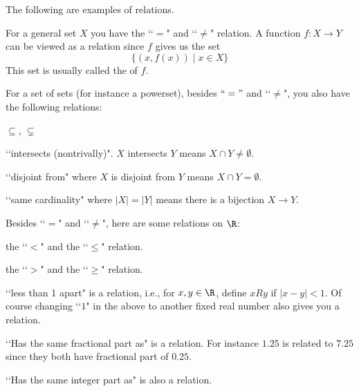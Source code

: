 The following are examples of relations.

\begin{eg}
  For a general set $X$ you have the \lq\lq $=$" and \lq\lq $\neq$" relation.
  A function $f:X \rightarrow Y$ can be viewed as a relation since $f$
  gives us the set
  \[
  \{ (x, f(x)) \mid x \in X \}
  \]
  This set is usually called the  of $f$.
\end{eg}

\begin{eg}
  For a set of sets (for instance a powerset), besides $\lq\lq ="$
  and \lq\lq$\neq$", you also have the following relations: 
  \begin{myenum}
    \item  $\subseteq$, $\subsetneq$
    \item \lq\lq intersects (nontrivally)".
      $X$ intersects $Y$ means $X \cap Y \neq \emptyset$.
    \item \lq\lq disjoint from" where
    $X$ is disjoint from $Y$ means $X \cap Y = \emptyset$.
    \item \lq\lq same cardinality" where
    $|X| = |Y|$ means there is a bijection $X \rightarrow Y$.
  \end{myenum}
\end{eg}

\begin{eg}
  Besides \lq\lq $=$" and \lq\lq $\neq$",
  here are some relations on $\R$:
  \begin{myenum}
  \item the \lq\lq $<$" and the \lq\lq $\leq$" relation.
  \item the \lq\lq $>$" and the \lq\lq $\geq$" relation.
  \item \lq\lq less than 1 apart" is a relation, i.e., for $x,y \in \R$,
    define $x R y$ if $|x - y| < 1$.
    Of course changing \lq\lq $1$" in the above to another fixed real number
    also
    gives you a relation.
  \item \lq\lq Has the same fractional part as" is a relation.
    For instance $1.25$ is related to $7.25$ since they both have fractional
    part of $0.25$.
  \item \lq\lq Has the same integer part as" is also a relation. 
  \end{myenum}
\end{eg}

